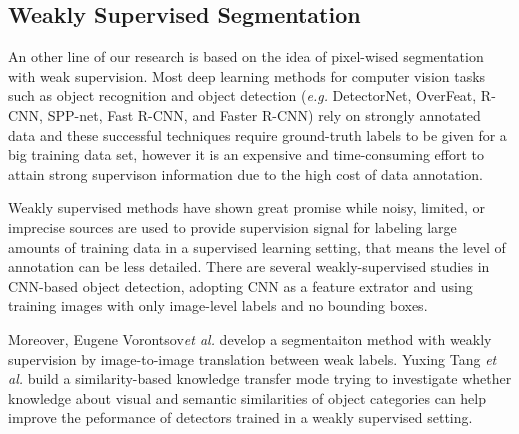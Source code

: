 \documentclass[10pt,twocolumn,letterpaper]{article}
\begin{document}
\subsection{Weakly Supervised Segmentation}
An other line of our research is based on the idea of pixel-wised segmentation with weak supervision.
Most deep learning methods for computer vision tasks such as object recognition\cite{simonyan2014very}\cite{russakovsky2015imagenet} and object detection (\textit{e.g.} DetectorNet\cite{szegedy2013deep}, OverFeat\cite{sermanet2013overfeat}, R-CNN\cite{girshick2014rich}, SPP-net\cite{he2015spatial}, Fast R-CNN\cite{girshick2015fast}, and Faster R-CNN\cite{ren2015faster}) rely on strongly annotated data and these successful techniques require ground-truth labels to be given for a big training data set, 
however it is an expensive and time-consuming effort to attain strong supervison information due to the high cost of data annotation.

Weakly supervised methods\cite{bilen2016weakly}\cite{peyre2017weakly}\cite{arandjelovic2016netvlad} have shown great promise while noisy, limited, or imprecise sources are used to provide supervision signal for labeling large amounts of training data in a supervised learning setting, that means the level of annotation can be less detailed. 
There are several weakly-supervised studies\cite{bilen2014weakly}\cite{bilen2015weakly}\cite{song2014learning} in CNN-based object detection, adopting CNN as a feature extrator and using training images with only image-level labels and no bounding boxes.

Moreover, Eugene Vorontsov\textit{et al.} \cite{vorontsov2019boosting} develop a segmentaiton method with weakly supervision by image-to-image translation between weak labels.
Yuxing Tang \textit{et al.}\cite{tang2016large} build a similarity-based knowledge transfer mode trying to investigate whether knowledge about visual and semantic similarities of object categories can help improve the peformance of detectors trained in a weakly supervised setting.
\end{document}
